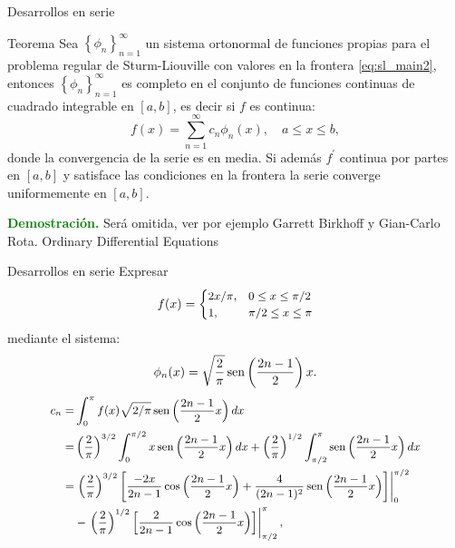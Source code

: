 \documentclass[xcolor=dvipsnames,a4paper,10pt,handout]{beamer}
\renewcommand{\textbf}[1]{\textcolor{green}{\bfseries #1}}
\begin{document}
 \begin{frame}{Desarrollos en serie}
 \onslide<+->
 \begin{block}{Teorema}  Sea $\left\{\phi_{n}\right\}_{n=1}^{\infty}$ un sistema ortonormal de funciones propias para el problema regular de Sturm-Liouville con valores en la frontera \eqref{eq:sl_main2}, entonces $\left\{\phi_{n}\right\}_{n=1}^{\infty}$ es completo en el conjunto de funciones continuas de cuadrado integrable en $[a,b]$, es decir si $f$ es continua:
  $$f(x)=\sum_{n=1}^{\infty} c_{n} \phi_{n}(x), \quad a \leq x \leq b,$$
  donde la convergencia de la serie es en media. Si además $f^{\prime}$ continua por partes  en $[a, b]$ y satisface las condiciones en la frontera la serie converge uniformemente en $[a, b]$.
 \end{block}
 
 \onslide<+->
 \textbf{Demostración.}  Será omitida, ver por ejemplo Garrett Birkhoff y Gian-Carlo Rota. Ordinary Differential Equations
 \end{frame}

 \begin{frame}{Desarrollos en serie}
Expresar
$$\small
f(x)= \begin{cases}2 x / \pi, & 0 \leq x \leq \pi / 2 \\ 1, & \pi / 2 \leq x \leq \pi\end{cases}
$$
mediante  el sistema:
$$\small
\phi_{n}(x)=\sqrt{\frac{2}{\pi}}\operatorname{sen}\left(\frac{2 n-1}{2}\right) x. $$ 
$$\small
\begin{aligned}
c_{n}=& \int_{0}^{\pi} f(x) \sqrt{2 / \pi} \operatorname{sen}\left(\frac{2 n-1}{2} x\right) d x \\
=&\left(\frac{2}{\pi}\right)^{3 / 2} \int_{0}^{\pi / 2} x \operatorname{sen}\left(\frac{2 n-1}{2} x\right) d x+\left(\frac{2}{\pi}\right)^{1 / 2} \int_{\pi / 2}^{\pi} \operatorname{sen}\left(\frac{2 n-1}{2} x\right) d x \\
=&\left.\left(\frac{2}{\pi}\right)^{3 / 2}\left[\frac{-2 x}{2 n-1} \cos \left(\frac{2 n-1}{2} x\right)+\frac{4}{(2 n-1)^{2}} \operatorname{sen}\left(\frac{2 n-1}{2} x\right)\right]\right|_{0} ^{\pi / 2} \\
&-\left.\left(\frac{2}{\pi}\right)^{1 / 2}\left[\frac{2}{2 n-1} \cos \left(\frac{2 n-1}{2} x\right)\right]\right|_{\pi / 2} ^{\pi},
\end{aligned}
$$
 \end{frame}
\end{document}
